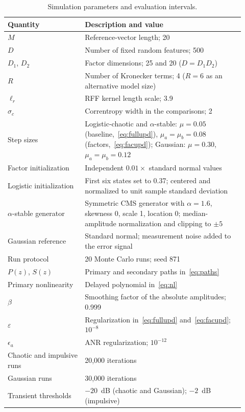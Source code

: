 \documentclass[preprint,12pt]{elsarticle}
\begin{document}
\begin{table}[t]
\centering
\caption{Simulation parameters and evaluation intervals.}
\label{tab:config}
\begin{tabular}{p{0.30\linewidth}p{0.62\linewidth}}
\toprule
Quantity & Description and value \\
\midrule
$M$ & Reference-vector length; 20 \\
$D$ & Number of fixed random features; 500 \\
$D_1$, $D_2$ & Factor dimensions; 25 and 20 ($D = D_1 D_2$) \\
$R$ & Number of Kronecker terms; 4 ($R = 6$ as an alternative model size) \\
$\ell_r$ & RFF kernel length scale; 3.9 \\
$\sigma_c$ & Correntropy width in the comparisons; 2 \\
Step sizes & Logistic-chaotic and $\alpha$-stable: $\mu = 0.05$ (baseline,~\eqref{eq:fullupd}), $\mu_a = \mu_b = 0.08$ (factors,~\eqref{eq:facupd}); Gaussian: $\mu = 0.30$, $\mu_a = \mu_b = 0.12$ \\
Factor initialization & Independent $0.01 \times$ standard normal values \\
Logistic initialization & First six states set to 0.37; centered and normalized to unit sample standard deviation \\
$\alpha$-stable generator & Symmetric CMS generator with $\alpha = 1.6$, skewness 0, scale 1, location 0; median-amplitude normalization and clipping to $\pm 5$ \\
Gaussian reference & Standard normal; measurement noise added to the error signal \\
Run protocol & 20 Monte Carlo runs; seed 871 \\
$P(z)$, $S(z)$ & Primary and secondary paths in~\eqref{eq:paths} \\
Primary nonlinearity & Delayed polynomial in~\eqref{eq:nl} \\
$\beta$ & Smoothing factor of the absolute amplitudes; 0.999 \\
$\varepsilon$ & Regularization in~\eqref{eq:fullupd} and~\eqref{eq:facupd}; $10^{-8}$ \\
$\epsilon_a$ & ANR regularization; $10^{-12}$ \\
Chaotic and impulsive runs & 20,000 iterations \\
Gaussian runs & 30,000 iterations \\
Transient thresholds & $-20$~dB (chaotic and Gaussian); $-2$~dB (impulsive) \\
\bottomrule
\end{tabular}
\end{table}
\end{document}
